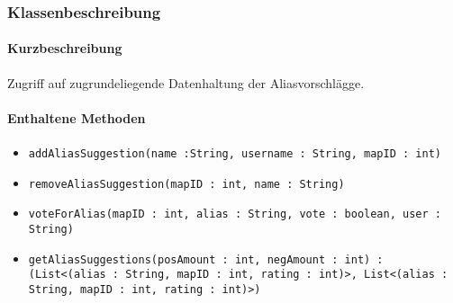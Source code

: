 \subsubsection*{Klassenbeschreibung}%
\paragraph*{Kurzbeschreibung}
Zugriff auf zugrundeliegende Datenhaltung der Aliasvorschlägge.
\paragraph*{Enthaltene Methoden}
\begin{itemize}
    \item \texttt{addAliasSuggestion(name :String, username : String, mapID : int)}
    \item \texttt{removeAliasSuggestion(mapID : int, name : String)}
    \item \texttt{voteForAlias(mapID : int, alias : String, vote : boolean, user : String)}
    \item \texttt{getAliasSuggestions(posAmount : int, negAmount : int) : (List<(alias : String, mapID : int, rating : int)>, List<(alias : String, mapID : int, rating : int)>)}
\end{itemize}
